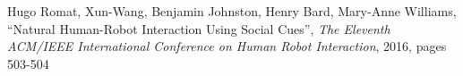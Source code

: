 \documentclass[letterpaper,12pt]{article}
\begin{document}
\begin{thebibliography}{9}
\footnotesize
\setlength{\itemsep}{0pt}
Hugo Romat, Xun-Wang, Benjamin Johnston, Henry Bard, Mary-Anne Williams, ``Natural Human-Robot Interaction Using Social Cues'', \emph{The Eleventh ACM/IEEE International Conference on Human Robot Interaction}, 2016, pages 503-504
\end{thebibliography}
\end{document}
